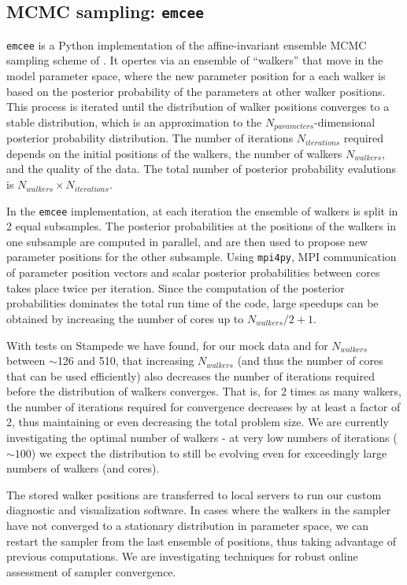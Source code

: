 \documentclass{article}
\begin{document}
\subsection{MCMC sampling: \texttt{emcee}}
\label{sec:emcee}
\texttt{emcee} is a Python implementation of the affine-invariant ensemble MCMC sampling scheme of \cite{goodman_weare}.  It opertes via an ensemble of ``walkers'' that move in the model parameter space, where the new parameter position for a each walker is based on the posterior probability of the parameters at other walker positions.   This process is iterated until the distribution of walker positions converges to a stable distribution, which is an approximation to the $N_{parameters}$-dimensional posterior probability distribution. The number of iterations $N_{iterations}$ required depends on the initial positions of the walkers, the number of walkers $N_{walkers}$, and the quality of the data.  The total number of posterior probability evalutions is $N_{walkers} \times N_{iterations}$.

In the \texttt{emcee} implementation, at each iteration the ensemble of walkers is split in 2 equal subsamples. The posterior probabilities at the positions of the walkers in one subsample are computed in parallel, and are then used to propose new parameter positions for the other subsample. Using \texttt{mpi4py}, MPI communication of parameter position vectors and scalar posterior probabilities between cores takes place twice per iteration. Since the computation of the posterior probabilities dominates the total run time of the code, large speedups can be obtained by increasing the number of cores up to $N_{walkers}/2 + 1$.  

With tests on Stampede we have found, for our mock data and for $N_{walkers}$ between $\sim$126 and 510, that increasing $N_{walkers}$ (and thus the number of cores that can be used efficiently) also decreases the number of iterations required before the distribution of walkers converges.  That is, for 2 times as many walkers, the number of iterations required for convergence decreases by at least a factor of 2, thus maintaining or even decreasing the total problem size.  We are currently investigating the optimal number of walkers - at very low numbers of iterations ($\sim 100$) we expect the distribution to still be evolving even for exceedingly large numbers of walkers (and cores).

The stored walker positions are transferred to local servers to run our custom diagnostic and visualization software.  
In cases where the walkers in the sampler have not converged to a stationary distribution in parameter space, we can restart the sampler from the last ensemble of positions, thus taking advantage of previous computations.  
We are investigating techniques for robust online assessment of sampler convergence.
\end{document}
